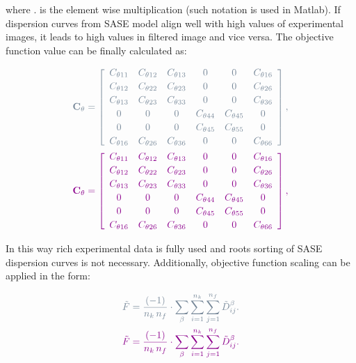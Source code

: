     where \(.\) is the element wise multiplication (such notation is used in Matlab). If 
    dispersion curves from SASE model align well with high values of experimental 
    images, it leads to high values in filtered image and vice versa.
	The objective function value can be finally calculated as: 
	
\begin{equation}
\begin{aligned}
\DIFdelmath{
 \matr{C}_{\theta} = \left[\begin{array}{cccccc} C_{\theta 11} & C_{\theta 12}& 
 C_{\theta 13} & 
0&0&C_{\theta 16}\\[2pt]
 C_{\theta 12}& C_{\theta 22} & C_{\theta 23}& 0 &0&C_{\theta 26}\\[2pt]
 C_{\theta 13}&C_{\theta 23}&C_{\theta 33}&0&0&C_{\theta 36}\\[2pt]
 0& 0&0&C_{\theta 44}& C_{\theta 45}&0\\[2pt]
 0&0&0&C_{\theta 45}&C_{\theta 55}&0\\[2pt]
 C_{\theta 16}&C_{\theta 26} &C_{\theta 36}&0&0&C_{\theta 66}
 \end{array}\right], 
}\\
\DIFaddmath{
 \matr{C}_{\theta} = \left[\begin{array}{cccccc} C_{\theta 11} & C_{\theta 12}& C_{\theta 13} & 0&0&C_{\theta 16}\\[2pt]
 C_{\theta 12}& C_{\theta 22} & C_{\theta 23}& 0 &0&C_{\theta 26}\\[2pt]
 C_{\theta 13}&C_{\theta 23}&C_{\theta 33}&0&0&C_{\theta 36}\\[2pt]
 0& 0&0&C_{\theta 44}& C_{\theta 45}&0\\[2pt]
 0&0&0&C_{\theta 45}&C_{\theta 55}&0\\[2pt]
 C_{\theta 16}&C_{\theta 26} &C_{\theta 36}&0&0&C_{\theta 66}
 \end{array}\right], 
}
\end{aligned}
\label{eq:elastic_constatns_theta}
\end{equation}

	In this way rich experimental data is fully used and roots sorting of SASE dispersion curves is not necessary. Additionally,  objective function scaling can be applied in the form:
	
\begin{equation}
\begin{aligned}
\DIFdelmath{
	\tilde{F} = \frac{(-1)}{n_k \, n_f}  \cdot \sum_{\beta}  \sum_{i=1}^{n_k} 
	\sum_{j=1}^{n_f}	
\tilde{D}_{ij}^{\beta}. 
	}\\
\DIFaddmath{
	\tilde{F} = \frac{(-1)}{n_k \, n_f}  \cdot \sum_{\beta}  \sum_{i=1}^{n_k} \sum_{j=1}^{n_f}	\tilde{D}_{ij}^{\beta}. 
	}
\end{aligned}
\end{equation}
\DIFdel{
	
	}\DIFadd{}

